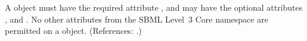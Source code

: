 A \FunctionDefinition object must have the required attribute ,
and may have the optional attributes ,  and
.  No other attributes from the SBML Level~3 Core namespace are
permitted on a \FunctionDefinition object.  (References: .)
